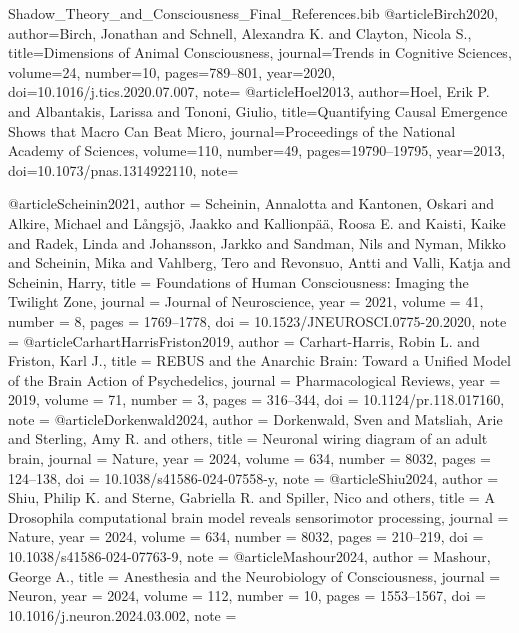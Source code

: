 \begin{filecontents*}[overwrite]{Shadow_Theory_and_Consciousness_Final_References.bib}
@article{Birch2020,
 author={Birch, Jonathan and Schnell, Alexandra K. and Clayton, Nicola S.},
 title={Dimensions of Animal Consciousness},
 journal={Trends in Cognitive Sciences}, volume={24}, number={10}, pages={789--801}, year={2020},
 doi={10.1016/j.tics.2020.07.007},
 note={}
}
@article{Hoel2013,
 author={Hoel, Erik P. and Albantakis, Larissa and Tononi, Giulio},
 title={Quantifying Causal Emergence Shows that Macro Can Beat Micro},
 journal={Proceedings of the National Academy of Sciences}, volume={110}, number={49}, pages={19790--19795}, year={2013},
 doi={10.1073/pnas.1314922110},
 note={}
}


@article{Scheinin2021,
 author = {Scheinin, Annalotta and Kantonen, Oskari and Alkire, Michael and L{\aa}ngsj{\"o}, Jaakko and Kallionp{\"a}{\"a}, Roosa E. and Kaisti, Kaike and Radek, Linda and Johansson, Jarkko and Sandman, Nils and Nyman, Mikko and Scheinin, Mika and Vahlberg, Tero and Revonsuo, Antti and Valli, Katja and Scheinin, Harry},
 title = {Foundations of Human Consciousness: Imaging the Twilight Zone},
 journal = {Journal of Neuroscience}, year = {2021}, volume = {41}, number = {8}, pages = {1769--1778},
 doi = {10.1523/JNEUROSCI.0775-20.2020},
 note = {}
}
@article{CarhartHarrisFriston2019,
 author = {Carhart-Harris, Robin L. and Friston, Karl J.},
 title = {{REBUS} and the Anarchic Brain: Toward a Unified Model of the Brain Action of Psychedelics},
 journal = {Pharmacological Reviews}, year = {2019}, volume = {71}, number = {3}, pages = {316--344},
 doi = {10.1124/pr.118.017160},
 note = {}
}
@article{Dorkenwald2024,
 author = {Dorkenwald, Sven and Matsliah, Arie and Sterling, Amy R. and others},
 title = {Neuronal wiring diagram of an adult brain},
 journal = {Nature}, year = {2024}, volume = {634}, number = {8032}, pages = {124--138},
 doi = {10.1038/s41586-024-07558-y},
 note = {}
}
@article{Shiu2024,
 author = {Shiu, Philip K. and Sterne, Gabriella R. and Spiller, Nico and others},
 title = {A {Drosophila} computational brain model reveals sensorimotor processing},
 journal = {Nature}, year = {2024}, volume = {634}, number = {8032}, pages = {210--219},
 doi = {10.1038/s41586-024-07763-9},
 note = {}
}
@article{Mashour2024,
 author = {Mashour, George A.},
 title = {Anesthesia and the Neurobiology of Consciousness},
 journal = {Neuron}, year = {2024}, volume = {112}, number = {10}, pages = {1553--1567},
 doi = {10.1016/j.neuron.2024.03.002},
 note = {}
}



\end{filecontents*}
